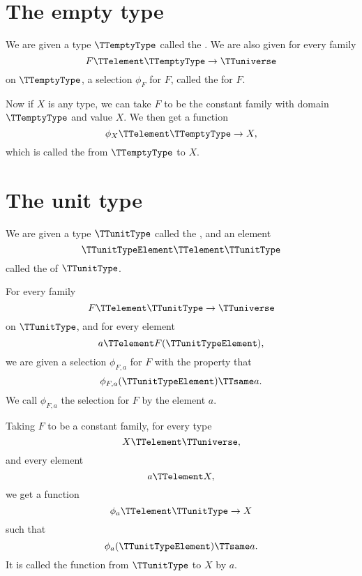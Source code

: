 \documentclass{article}
\begin{document}
\section{The empty type}
\label{sec:empty-type}

We are given a type $\TTemptyType$ called the .  We are also given for every family
\begin{equation*}
  F \TTelement \TTemptyType \to \TTuniverse
\end{equation*}
on $\TTemptyType$, a selection $\phi_F$ for $F$, called the
 for $F$.

Now if $X$ is any type, we can take $F$ to be the constant family with
domain $\TTemptyType$ and value $X$.  We then get a function
\begin{equation*}
  \phi_X \TTelement \TTemptyType \to X,
\end{equation*}
which is called the  from
$\TTemptyType$ to $X$.

\section{The unit type}
\label{sec:unit-type}

We are given a type $\TTunitType$ called the ,
and an element
\begin{equation*}
  \TTunitTypeElement \TTelement \TTunitType
\end{equation*}
called the  of $\TTunitType$.

For every family
\begin{equation*}
  F \TTelement \TTunitType \to \TTuniverse
\end{equation*}
on $\TTunitType$, and for every element
\begin{equation*}
  a \TTelement F(\TTunitTypeElement),
\end{equation*}
we are given a selection $\phi_{F,a}$ for $F$ with the property that
\begin{equation*}
  \phi_{F,a}(\TTunitTypeElement) \TTsame a.
\end{equation*}
We call $\phi_{F,a}$ the selection for $F$  by
the element $a$.

Taking $F$ to be a constant family, for every type
\begin{equation*}
  X \TTelement \TTuniverse,
\end{equation*}
and every element
\begin{equation*}
  a \TTelement X,
\end{equation*}
we get a function
\begin{equation*}
  \phi_a \TTelement \TTunitType \to X
\end{equation*}
such that
\begin{equation*}
  \phi_a(\TTunitTypeElement) \TTsame a.
\end{equation*}
It is called the function from $\TTunitType$ to $X$
 by $a$.
\end{document}
